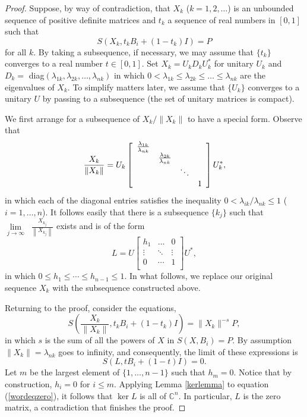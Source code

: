 \documentclass{amsart}
\theoremstyle{definition}
\theoremstyle{remark}
\numberwithin{equation}{section}
\newcommand{\<}{\langle}
\renewcommand{\>}{\rangle}
\begin{document}
\begin{proof}
Suppose, by way of contradiction, that $X_{k}$ ($k= 1,2,\ldots$)
is an unbounded sequence of positive definite matrices and $t_k$ a
sequence of real numbers in $[0,1]$ such that
\[S\left(X_{k},t_kB_i+(1-t_k)I \right) = P\] for all $k$. By taking a subsequence, if necessary, we may assume that $\{t_k\}$
converges to a real number $t \in [0,1]$.  Set $X_{k} =
U_{k}D_{k}U_{k}^{*}$ for unitary $U_{k}$ and $D_{k} =$
diag$(\lambda_{1k}, \lambda_{2k} , \ldots, \lambda_{nk})$ in which
$0 < \lambda_{1k} \leq \lambda_{2k} \leq \ldots \leq \lambda_{nk}$
are the eigenvalues of $X_{k}$. To simplify matters later, we assume that $\{U_{k}\}$ converges to a unitary $U$ by
passing to a subsequence (the set of unitary matrices is compact).

We first arrange for a subsequence of $X_{k}/\|X_k\|$ to have a
special form.  Observe that \[\frac{X_{k}}{\|X_k\|} = U_{k}\left[
{\begin{array}{*{20}c}
   {\frac{{\lambda _{1k} }}
{{\lambda _{nk} }}} & {} & {} & {}  \\
   {} & {\frac{{\lambda _{2k} }}
{{\lambda _{nk} }}} & {} & {}  \\
   {} & {} &  \ddots  & {}  \\
   {} & {} & {} & 1  \\
 \end{array} } \right]U_{k}^{*},\] in which each of the diagonal entries satisfies
the inequality $0 < \lambda_{ik}/\lambda_{nk} \leq 1$ ($i =
1,\ldots,n$). It follows easily that there is a subsequence
$\{k_j\}$ such that $\mathop {\lim }\limits_{j \to \infty }
\;\;\frac{{X_{k_j }}}{{\left\| X_{k_j} \right\|}}$ exists and is
of the form
\[L = U\left[
 {\begin{matrix}
   h_1 &  \ldots  & 0  \\
    \vdots  &  \ddots  &  \vdots   \\
   0 &  \cdots  & {1 }  \\
 \end{matrix}} \right]U^*,\] in which $0 \leq h_1 \leq
 \cdots \leq h_{n-1} \leq 1$.  In what follows, we
replace our original sequence $X_k$ with the subsequence
constructed above.

Returning to the proof, consider the equations, \[S \left(\frac{X_{k}}{\|X_k\|},t_kB_i+(1-t_k)I \right) =
\|X_k\|^{-s}P,\] in which $s$ is the sum of all the powers of $X$
in $S(X,B_i) = P$.  By assumption $\|X_k\| = \lambda_{nk}$ goes to
infinity, and consequently, the limit of these expressions is
\begin{equation}\label{wordeqzero}
S(L,tB_i+(1-t)I) = 0.
\end{equation}
Let $m$ be the largest element of $\{1,\ldots,n-1\}$ such that
$h_m = 0$.  Notice that by construction, $h_i = 0$ for $i \leq m$.  Applying Lemma \ref{kerlemma} to equation (\ref{wordeqzero}), it follows that $\ker L$ is all of $\mathbb C^n$.  In particular, $L$ is the zero matrix, a contradiction that finishes the proof.
\end{proof}
\end{document}
